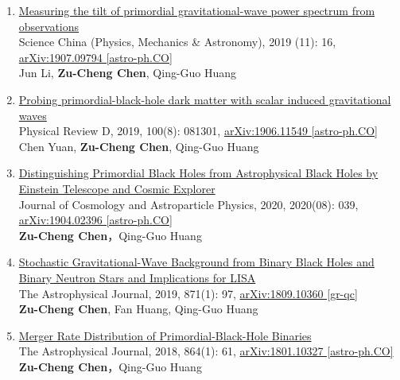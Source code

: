 \begin{enumerate}
    \item \href{https://link.springer.com/article/10.1007/s11433-019-9605-5}{Measuring the tilt of primordial gravitational-wave power spectrum from observations}\\
    Science China (Physics, Mechanics \& Astronomy), 2019 (11): 16, \href{https://arxiv.org/abs/1907.09794}{arXiv:1907.09794 [astro-ph.CO]}\\
    Jun Li, \textbf{Zu-Cheng Chen}, Qing-Guo Huang
    
    \item \href{https://journals.aps.org/prd/abstract/10.1103/PhysRevD.100.081301}{Probing primordial-black-hole dark matter with scalar induced gravitational waves}\\
    Physical Review D, 2019, 100(8): 081301, \href{https://arxiv.org/abs/1906.11549}{arXiv:1906.11549 [astro-ph.CO]}\\
    Chen Yuan, \textbf{Zu-Cheng Chen}, Qing-Guo Huang
    
    \item \href{https://iopscience.iop.org/article/10.1088/1475-7516/2020/08/039}{Distinguishing Primordial Black Holes from Astrophysical Black Holes by Einstein Telescope and Cosmic Explorer}\\
    Journal of Cosmology and Astroparticle Physics, 2020, 2020(08): 039, \href{https://arxiv.org/abs/1904.02396}{arXiv:1904.02396 [astro-ph.CO]}\\
    \textbf{Zu-Cheng Chen}，Qing-Guo Huang
    
    \item \href{https://iopscience.iop.org/article/10.3847/1538-4357/aaf581}{Stochastic Gravitational-Wave Background from Binary Black Holes and Binary Neutron Stars and Implications for LISA}\\
    The Astrophysical Journal, 2019, 871(1): 97, \href{https://arxiv.org/abs/1809.10360}{arXiv:1809.10360 [gr-qc]}\\
    \textbf{Zu-Cheng Chen}, Fan Huang, Qing-Guo Huang
    
    \item \href{https://iopscience.iop.org/article/10.3847/1538-4357/aad6e2}{Merger Rate Distribution of Primordial-Black-Hole Binaries}\\
    The Astrophysical Journal, 2018, 864(1): 61, \href{https://arxiv.org/abs/1801.10327}{arXiv:1801.10327 [astro-ph.CO]}\\
    \textbf{Zu-Cheng Chen}，Qing-Guo Huang
\end{enumerate} 

